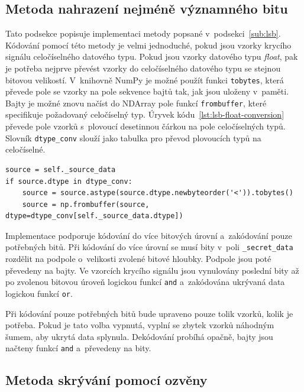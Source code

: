 \subsection*{Metoda nahrazení nejméně významného bitu}
\label{sub:lsb-implementation}

Tato podsekce popisuje implementaci metody popsané v~podsekci~\ref{sub:lsb}.
Kódování pomocí této metody je velmi jednoduché, pokud jsou vzorky krycího
signálu celočíselného datového typu. Pokud jsou vzorky datového typu
\textit{float}, pak je potřeba nejprve převést vzorky do celočíselného datového
typu se stejnou bitovou velikostí. V~knihovně NumPy je možné použít funkci
\texttt{tobytes}, která převede pole se vzorky na pole sekvence bajtů tak, jak
jsou uloženy v~paměti. Bajty je možné znovu načíst do NDArray pole funkcí
\texttt{frombuffer}, které specifikuje požadovaný celočíselný typ. Úryvek
kódu~\ref{lst:lsb-float-conversion} převede pole vzorků s~plovoucí desetinnou
čárkou na pole celočíselných typů. Slovník \texttt{dtype\_conv} slouží jako
tabulka pro převod plovoucích typů na celočíselné.

\begin{lstlisting}[language=PythonPlus, label={lst:lsb-float-conversion},
caption={Převedení datového typu s~plovoucí desetinnou čárkou na celočíselný
datový typ.}]
source = self._source_data
if source.dtype in dtype_conv:
    source = source.astype(source.dtype.newbyteorder('<')).tobytes()
    source = np.frombuffer(source, dtype=dtype_conv[self._source_data.dtype])
\end{lstlisting}

Implementace podporuje kódování do více bitových úrovní a~zakódování pouze
potřebných bitů. Při kódování do více úrovní se musí bity v~poli
\texttt{\_secret\_data} rozdělit na podpole o~velikosti zvolené bitové hloubky.
Podpole jsou poté převedeny na bajty. Ve vzorcích krycího signálu jsou
vynulovány poslední bity až po zvolenou bitovou úroveň logickou funkcí
\texttt{and} a~zakódována ukrývaná data logickou funkcí \texttt{or}.

Při kódování pouze potřebných bitů bude upraveno pouze tolik vzorků, kolik je
potřeba. Pokud je tato volba vypnutá, vyplní se zbytek vzorků náhodným šumem,
aby ukrytá data splynula. Dekódování probíhá opačně, bajty jsou načteny funkcí
\texttt{and} a~převedeny na bity.

\subsection*{Metoda skrývání pomocí ozvěny}
\label{sub:echo-hiding-implementation}


